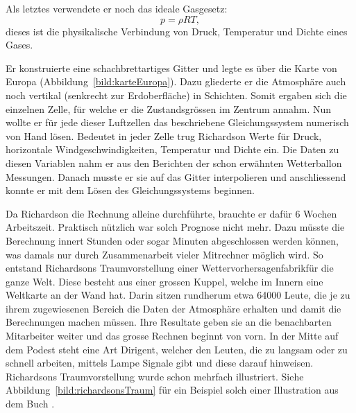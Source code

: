 Als letztes verwendete er noch das ideale Gasgesetz:
\begin{equation}
	p = \rho R T,
	\label{eq:gasgesetz}
\end{equation}
dieses ist die physikalische Verbindung von Druck, Temperatur und Dichte eines Gases.  

Er konstruierte eine schachbrettartiges Gitter und legte es über die Karte von Europa (Abbildung~\ref{bild:karteEuropa}).
Dazu gliederte er die Atmosphäre auch noch vertikal (senkrecht zur Erdoberfläche) in Schichten.
Somit ergaben sich die einzelnen Zelle, für welche er die Zustandsgrössen im Zentrum annahm. 
Nun wollte er für jede dieser Luftzellen das beschriebene Gleichungssystem numerisch von Hand lösen.
Bedeutet in jeder Zelle trug Richardson Werte für Druck, horizontale Windgeschwindigkeiten, Temperatur und Dichte ein.
Die Daten zu diesen Variablen nahm er aus den Berichten der schon erwähnten Wetterballon Messungen.
Danach musste er sie auf das Gitter interpolieren und anschliessend konnte er mit dem Lösen des Gleichungssystems beginnen.

Da Richardson die Rechnung alleine durchführte, brauchte er dafür 6 Wochen Arbeitszeit. 
Praktisch nützlich war solch Prognose nicht mehr.
Dazu müsste die Berechnung innert Stunden oder sogar Minuten abgeschlossen werden können, was damals nur durch Zusammenarbeit vieler Mitrechner möglich wird. 
So entstand Richardsons Traumvorstellung einer \glqq Wettervorhersagenfabrik\grqq für die ganze Welt.
Diese besteht aus einer grossen Kuppel, welche im Innern eine Weltkarte an der Wand hat. 
Darin sitzen rundherum etwa 64000 Leute, die je zu ihrem zugewiesenen Bereich die Daten der Atmosphäre erhalten und damit die Berechnungen machen müssen. 
Ihre Resultate geben sie an die benachbarten Mitarbeiter weiter und das grosse Rechnen beginnt von vorn. 
In der Mitte auf dem Podest steht eine Art \glqq Dirigent\grqq, welcher den Leuten, die zu langsam oder zu schnell arbeiten, mittels Lampe Signale gibt und diese darauf hinweisen.
Richardsons Traumvorstellung wurde schon mehrfach illustriert.
Siehe Abbildung~\ref{bild:richardsonsTraum} für ein Beispiel solch einer Illustration aus dem Buch \cite{geostrophisch:richardsonsDream}.

